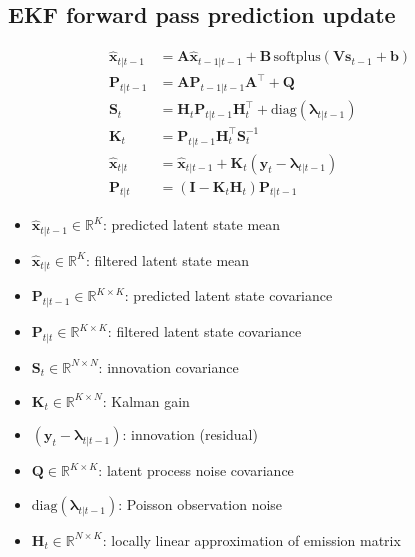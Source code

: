 \documentclass[11pt,letterpaper]{article} %
\begin{document}
\subsection*{EKF forward pass prediction update}
\noindent
\begin{minipage}[t]{0.47\textwidth}
\begin{align*}
    \hat{\bm{x}}_{t|t-1} &= \bm{A}\hat{\bm{x}}_{t-1|t-1} 
    + \bm{B}\,\text{softplus}\!\left(\bm{V}\bm{s}_{t-1} + \bm{b}\right) \\
    \bm{P}_{t|t-1}       &= \bm{A}\bm{P}_{t-1|t-1}\bm{A}^\top + \bm{Q} \\
    \bm{S}_t             &= \bm{H}_t \bm{P}_{t|t-1} \bm{H}_t^\top
                                + \text{diag}(\boldsymbol{\lambda}_{t|t-1}) \\
    \bm{K}_t             &= \bm{P}_{t|t-1}\bm{H}_t^\top \bm{S}_t^{-1} \\
    \hat{\bm{x}}_{t|t}   &= \hat{\bm{x}}_{t|t-1}
                                + \bm{K}_t(\bm{y}_t - \boldsymbol{\lambda}_{t|t-1}) \\
    \bm{P}_{t|t}         &= (\bm{I} - \bm{K}_t \bm{H}_t)\bm{P}_{t|t-1}
\end{align*}
\end{minipage}
\hfill\vline\hfill
\begin{minipage}[t]{0.47\textwidth}
\begin{itemize}[leftmargin=*, itemsep=0em, topsep=0.2em]
    \item $\hat{\bm{x}}_{t|t-1} \in \mathbb{R}^{K}$: predicted latent state mean
    \item $\hat{\bm{x}}_{t|t} \in \mathbb{R}^{K}$: filtered latent state mean
    \item $\bm{P}_{t|t-1} \in \mathbb{R}^{K \times K}$: predicted latent state covariance
    \item $\bm{P}_{t|t} \in \mathbb{R}^{K \times K}$: filtered latent state covariance
    \item $\bm{S}_t \in \mathbb{R}^{N \times N}$: innovation covariance
    \item $\bm{K}_t \in \mathbb{R}^{K \times N}$: Kalman gain
    \item $(\bm{y}_t - \boldsymbol{\lambda}_{t|t-1})$: innovation (residual)
    \item $\bm{Q} \in \mathbb{R}^{K \times K}$: latent process noise covariance
    \item $\text{diag}(\boldsymbol{\lambda}_{t|t-1})$: Poisson observation noise
    \item $\bm{H}_t \in \mathbb{R}^{N \times K}$: locally linear approximation of emission matrix
\end{itemize}
\end{minipage}
\end{document}
